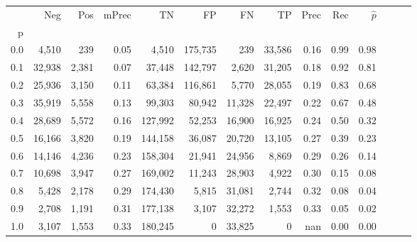 \begin{tabular}{rrrrrrrrrrrrrr}
\toprule
{} &     Neg &    Pos & mPrec &       TN &       FP &      FN &      TP &  Prec &   Rec & $\hat{p}$ \\
p   &         &        &       &          &          &         &         &       &       &           \\
\midrule
0.0 &   4,510 &    239 &  0.05 &    4,510 &  175,735 &     239 &  33,586 &  0.16 &  0.99 &      0.98 \\
0.1 &  32,938 &  2,381 &  0.07 &   37,448 &  142,797 &   2,620 &  31,205 &  0.18 &  0.92 &      0.81 \\
0.2 &  25,936 &  3,150 &  0.11 &   63,384 &  116,861 &   5,770 &  28,055 &  0.19 &  0.83 &      0.68 \\
0.3 &  35,919 &  5,558 &  0.13 &   99,303 &   80,942 &  11,328 &  22,497 &  0.22 &  0.67 &      0.48 \\
0.4 &  28,689 &  5,572 &  0.16 &  127,992 &   52,253 &  16,900 &  16,925 &  0.24 &  0.50 &      0.32 \\
0.5 &  16,166 &  3,820 &  0.19 &  144,158 &   36,087 &  20,720 &  13,105 &  0.27 &  0.39 &      0.23 \\
0.6 &  14,146 &  4,236 &  0.23 &  158,304 &   21,941 &  24,956 &   8,869 &  0.29 &  0.26 &      0.14 \\
0.7 &  10,698 &  3,947 &  0.27 &  169,002 &   11,243 &  28,903 &   4,922 &  0.30 &  0.15 &      0.08 \\
0.8 &   5,428 &  2,178 &  0.29 &  174,430 &    5,815 &  31,081 &   2,744 &  0.32 &  0.08 &      0.04 \\
0.9 &   2,708 &  1,191 &  0.31 &  177,138 &    3,107 &  32,272 &   1,553 &  0.33 &  0.05 &      0.02 \\
1.0 &   3,107 &  1,553 &  0.33 &  180,245 &        0 &  33,825 &       0 &   nan &  0.00 &      0.00 \\
\bottomrule
\end{tabular}
